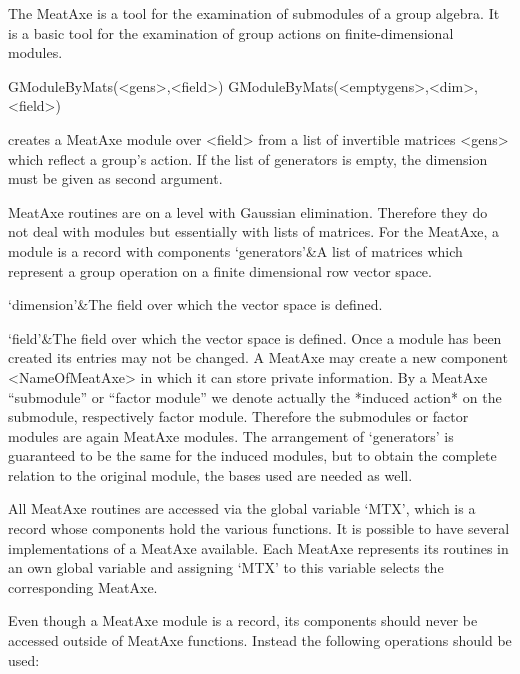 
The MeatAxe \cite{Par84} is a tool for the examination of submodules of a
group algebra. It is a basic tool for the examination of group actions on
finite-dimensional modules.


\>GModuleByMats(<gens>,<field>)
\>GModuleByMats(<emptygens>,<dim>,<field>)

creates a MeatAxe module over <field> from a list of invertible matrices 
<gens> which reflect a group's action. If the list of generators is empty,
the dimension must be given as second argument.

MeatAxe routines are on a level with Gaussian elimination. Therefore they do
not deal with {\GAP} modules but essentially with lists of matrices. For the
MeatAxe, a module is a record with components
\beginitems
`generators'&A list of matrices which represent a group operation on a
finite dimensional row vector space.

`dimension'&The field over which the vector space is defined.

`field'&The field over which the vector space is defined.
\enditems
Once a module has been created its entries may not be changed. A MeatAxe may
create a new component <NameOfMeatAxe> in which it can store private
information. By a MeatAxe ``submodule'' or ``factor module'' we denote
actually the *induced action* on the submodule, respectively factor module.
Therefore the submodules or factor modules are again MeatAxe modules. The
arrangement of `generators' is guaranteed to be the same for the induced
modules, but to obtain the complete relation to the original module, the
bases used are needed as well.


All MeatAxe routines are accessed via the global variable `MTX', which is a
record whose components hold the various functions. It is possible to have
several implementations of a MeatAxe available. Each MeatAxe represents its
routines in an own global variable and assigning `MTX' to this variable
selects the corresponding MeatAxe.


Even though a MeatAxe module is a record, its components should never be
accessed outside of MeatAxe functions. Instead the following operations
should be used:

